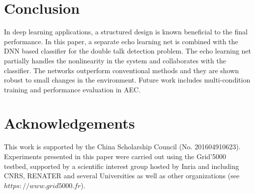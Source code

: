 \documentclass[a4paper]{article}
\begin{document}



\section{Conclusion}

In deep learning applications, a structured design is known beneficial to the final performance. In this paper, a separate echo learning net is combined with the DNN based classifier for the double talk detection problem. The echo learning net partially handles the nonlinearity in the system and collaborates with the classifier. The networks outperform conventional methods and they are shown robust to small changes in the environment. Future work includes multi-condition training and performance evaluation in AEC.


\section{Acknowledgements}

This work is supported by the China Scholarship Council (No. 201604910623). Experiments presented in this paper were carried out using the Grid'5000 testbed, supported by a scientific interest group hosted by Inria and including CNRS, RENATER and several Universities as well as other organizations (see $https://www.grid5000.fr$).





\end{document}
